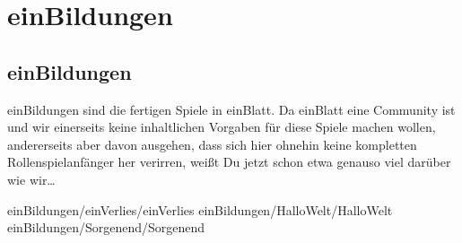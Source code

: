 \part {einBildungen}
\chapter {einBildungen}
einBildungen sind die fertigen Spiele in einBlatt. Da einBlatt eine Community ist und wir einerseits keine inhaltlichen Vorgaben für diese Spiele machen wollen, andererseits aber davon ausgehen, dass sich hier ohnehin keine kompletten Rollenspielanfänger her verirren, weißt Du jetzt schon etwa genauso viel darüber wie wir\dots

 {einBildungen/einVerlies/einVerlies} 
 {einBildungen/HalloWelt/HalloWelt}
 {einBildungen/Sorgenend/Sorgenend}  


